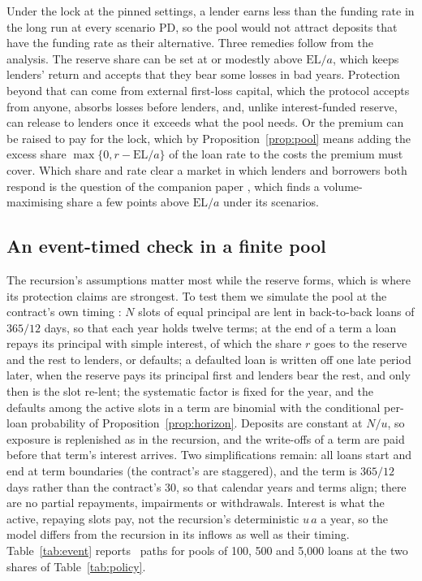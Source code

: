 \documentclass[11pt]{article}
\theoremstyle{plain}
\theoremstyle{definition}
\newcommand{\EL}{\mathrm{EL}}
\begin{document}
Under the lock at the pinned settings, a lender earns less than the funding rate in the long run at
every scenario PD, so the pool would not attract deposits that have the funding rate as their
alternative. Three remedies follow from the analysis. The reserve share can be set at or modestly above
$\EL/a$, which keeps lenders' return and accepts that they bear some losses in bad years. Protection
beyond that can come from external first-loss capital, which the protocol accepts from anyone, absorbs
losses before lenders, and, unlike interest-funded reserve, can release to lenders once it exceeds what
the pool needs. Or the premium can be raised to pay for the lock, which by Proposition~\ref{prop:pool}
means adding the excess share $\max\{0,r-\EL/a\}$ of the loan rate to the costs the premium must cover.
Which share and rate clear a market in which lenders and borrowers both respond is the question of the
companion paper \citep{lendingequilibrium2026}, which finds a volume-maximising share a few points above
$\EL/a$ under its scenarios.

\subsection{An event-timed check in a finite pool}\label{sec:event}

The recursion's assumptions matter most while the reserve forms, which is where its protection claims
are strongest. To test them we simulate the pool at the contract's own timing
\citep{microcredit2026contract}: $N$ slots of equal principal are lent in back-to-back loans of $365/12$
days, so that each year holds twelve terms; at the end of a term a loan repays its principal with simple
interest, of which the share $r$ goes to the reserve and the rest to lenders, or defaults; a defaulted
loan is written off one late period later, when the reserve pays its principal first and lenders bear
the rest, and only then is the slot re-lent; the systematic factor is fixed for the year, and the
defaults among the active slots in a term are binomial with the conditional per-loan probability of
Proposition~\ref{prop:horizon}. Deposits are constant at $N/u$, so exposure is replenished as in the
recursion, and the write-offs of a term are paid before that term's interest arrives. Two
simplifications remain: all loans start and end at term boundaries (the contract's are staggered),
and the term is $365/12$ days rather than the contract's 30, so that calendar years and terms align;
there are no partial repayments, impairments or withdrawals. Interest is what the active, repaying
slots pay, not the recursion's deterministic $u\,a$ a year, so the model differs from the recursion
in its inflows as well as their timing. Table~\ref{tab:event} reports \EventPaths\ paths for pools of
100, 500 and 5,000 loans at the two shares of Table~\ref{tab:policy}.
\end{document}
